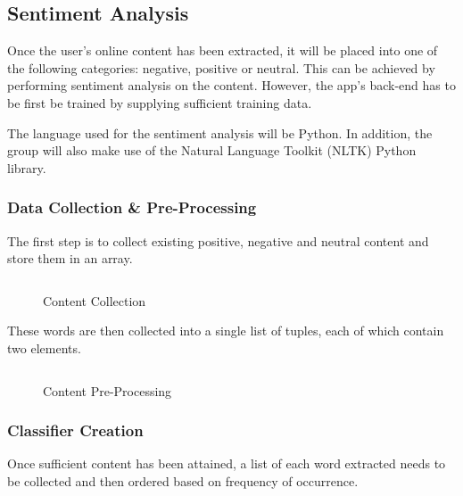 \clearpage

\subsection{Sentiment Analysis}

Once the user's online content has been extracted, it will be placed into one of the following categories: negative, positive or neutral. This can be achieved by performing sentiment analysis on the content. However, the app's back-end has to be first be trained by supplying sufficient training data.

The language used for the sentiment analysis will be Python. In addition, the group will also make use of the Natural Language Toolkit (NLTK) Python library.

\subsubsection{Data Collection \& Pre-Processing}

The first step is to collect existing positive, negative and neutral content and store them in an array.

\begin{figure}[h!]
  \centering
  \begin{minipage}{14cm}
    \centering
    \inputminted[fontsize=\footnotesize]{python}{inc/snippets/collection.py}
    \caption{Content Collection}
    \label{fig:sentiment_analysis_step1a}
  \end{minipage}
\end{figure}

These words are then collected into a single list of tuples, each of which contain two elements.

\begin{figure}[h!]
  \centering
  \begin{minipage}{14cm}
    \centering
    \inputminted[fontsize=\footnotesize]{python}{inc/snippets/collection_iteration.py}
    \caption{Content Pre-Processing}
    \label{fig:sentiment_analysis_step1b}
  \end{minipage}
\end{figure}

\subsubsection{Classifier Creation}

Once sufficient content has been attained, a list of each word extracted needs to be collected and then ordered based on frequency of occurrence. 

